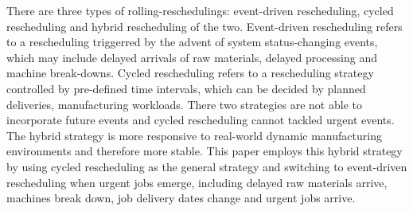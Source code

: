 There are three types of rolling-reschedulings: event-driven rescheduling, cycled rescheduling and hybrid rescheduling of the two.
Event-driven rescheduling refers to a rescheduling triggerred by the advent of system status-changing events, which may include delayed arrivals of raw materials, delayed processing and machine break-downs.
Cycled rescheduling refers to a rescheduling strategy controlled by pre-defined time intervals, which can be decided by planned deliveries, manufacturing workloads.
There two strategies are not able to incorporate future events and cycled rescheduling cannot tackled urgent events.
The hybrid strategy is more responsive to real-world dynamic manufacturing environments and therefore more stable.
This paper employs this hybrid strategy by using cycled rescheduling as the general strategy and switching to event-driven rescheduling when urgent jobs emerge, including delayed raw materials arrive, machines break down, job delivery dates change and urgent jobs arrive.